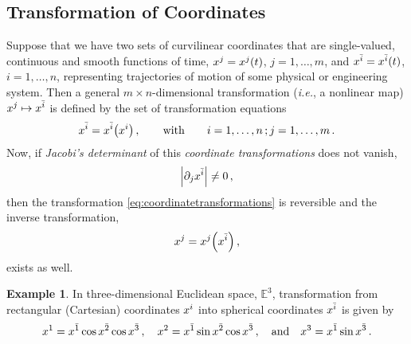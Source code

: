 \documentclass[aps,pra,10pt,a4paper]{revtex4-1}
\theoremstyle{plain}
\theoremstyle{definition}
\newtheorem{example}{Example}
\theoremstyle{remark}
\providecommand*{\lingo}[1]{\textsl{#1}}
\providecommand*{\lingform}[1]{\textit{#1}}
\providecommand*{\ie}{\lingform{i.e.}}
\providecommand*{\set}[1]{\mathbb{#1}}      %
\providecommand*{\espace}{\set{E}}          %
\providecommand*{\nespace}[1]{\espace^{#1}} %
\providecommand*{\pos}{x} %
\providecommand*{\ipd}[1]{\partial_{#1}}    %
\providecommand*{\iacood}[1]{\bar{#1}}         %
\providecommand*{\cvec}[2]{\tensor{#1}{^{#2}}} %
\providecommand*{\parens}[1]{\mleft({#1}\mright)}               %
\providecommand*{\vat}[1]{\parens{#1}}                          %
\begin{document}
\subsection{Transformation of Coordinates}
%
Suppose that we have two sets of curvilinear coordinates that are single-valued, continuous and smooth functions of time, $\cvec\pos j = \cvec\pos j\vat t$, $j = 1, \dotsc, m$, and $\cvec{\pos}{\iacood i} = \cvec{\pos}{\iacood i}\vat t$, $i = 1, \dotsc, n$, representing trajectories of motion of some physical or engineering system. Then a general $m\times n$-dimensional transformation (\ie, a nonlinear map) $\cvec\pos j\mapsto\cvec{\pos}{\iacood i}$ is defined by the set of transformation equations
%
\begin{equation}\label{eq:coordinatetransformations}
  \cvec{\pos}{\iacood i} = \cvec{\pos}{\iacood i}\vat{\cvec\pos i}\,,\qquad\text{with}\qquad
  i = 1, \dotsc, n\,;
  j = 1, \dotsc, m\,.
\end{equation}
%
Now, if \lingo{Jacobi's determinant} of this \lingo{coordinate transformations} does not vanish, 
%
\begin{equation*}
  \mleft\vert \ipd j\cvec\pos{\iacood i} \mright\vert \neq 0 \,,
\end{equation*}
%
then the transformation \cref{eq:coordinatetransformations} is reversible and the inverse transformation,
%
\begin{equation*}
  \cvec\pos j = \cvec\pos j\vat{\cvec{\pos}{\iacood i}}\,,
\end{equation*}
%
exists as well.

\begin{example}
In three-dimensional Euclidean space, $\nespace 3$, transformation from rectangular (Cartesian) coordinates $\cvec\pos i$ into spherical coordinates $\cvec{\pos}{\iacood i}$ is given by
%
\begin{equation}\label{eq:sphericalcoordinatetransformations}
  \cvec\pos 1 = \cvec\pos{\iacood 1}\cos\cvec\pos{\iacood 2}\cos\cvec\pos{\iacood 3} \,,\quad
  \cvec\pos 2 = \cvec\pos{\iacood 1}\sin\cvec\pos{\iacood 2}\cos\cvec\pos{\iacood 3} \,,\quad\text{and}\quad
  \cvec\pos 3 = \cvec\pos{\iacood 1}\sin\cvec\pos{\iacood 3}\,.
\end{equation}
%
\end{example}
\end{document}
